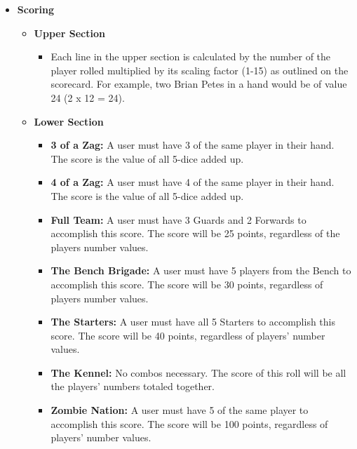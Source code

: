 \documentclass[]{report}   %
\begin{document}
\begin{itemize}
\begin{itemize}
\end{itemize}

\item \textbf{Scoring}
\begin{itemize}
\item \textbf{Upper Section}
\begin{itemize}
\item Each line in the upper section is calculated by the number of the player rolled multiplied by its scaling factor (1-15) as outlined on the scorecard. For example, two Brian Petes in a hand would be of value 24 (2 x 12 = 24).
\end{itemize}
\item \textbf{Lower Section}

\begin{itemize}
\item \textbf{3 of a Zag:} A user must have 3 of the same player in their hand. The score is the value of all 5-dice added up.
\item \textbf{4 of a Zag:} A user must have 4 of the same player in their hand. The score is the value of all 5-dice added up.
\item \textbf{Full Team:} A user must have 3 Guards and 2 Forwards to accomplish this score. The score will be 25 points, regardless of the players number values.
\item \textbf{The Bench Brigade:} A user must have 5 players from the Bench to accomplish this score. The score will be 30 points, regardless of players number values.
\item \textbf{The Starters:} A user must have all 5 Starters to accomplish this score. The score will be 40 points, regardless of players' number values.
\item \textbf{The Kennel:} No combos necessary. The score of this roll will be all the players' numbers totaled together.
\item \textbf{Zombie Nation:} A user must have 5 of the same player to accomplish this score. The score will be 100 points, regardless of players' number values.
\end{itemize}


\end{itemize}
\end{itemize}
\end{document}
